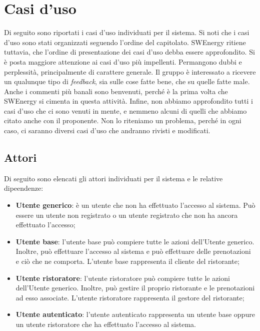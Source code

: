 \section{Casi d'uso}

Di seguito sono riportati i casi d'uso individuati per il sistema. Si noti che i
casi d'uso sono stati organizzati seguendo l'ordine del capitolato. SWEnergy
ritiene tuttavia, che l'ordine di presentazione dei casi d'uso debba essere
approfondito. Si è posta maggiore attenzione ai casi d'uso più impellenti.
Permangono dubbi e perplessità, principalmente di carattere generale. Il gruppo
è interessato a ricevere un qualunque tipo di \textit{feedback}, sia sulle cose
fatte bene, che su quelle fatte male. Anche i commenti più banali sono
benvenuti, perché è la prima volta che SWEnergy si cimenta in questa attività.
Infine, non abbiamo approfondito tutti i casi d'uso che ci sono venuti in mente,
e nemmeno alcuni di quelli che abbiamo citato anche con il proponente. Non lo
riteniamo un problema, perché in ogni caso, ci saranno diversi casi d'uso che
andranno rivisti e modificati.

\subsection{Attori}

Di seguito sono elencati gli attori individuati per il sistema e le relative
dipeendenze:
\begin{itemize}
	\item \textbf{Utente generico}: è un utente che non ha effettuato l'accesso al
	      sistema. Può essere un utente non registrato o un utente registrato che non ha
	      ancora effettuato l'accesso;

	\item \textbf{Utente base}: l'utente base può compiere tutte le azioni
	      dell'Utente generico. Inoltre, può effettuare l'accesso al sistema e può
	      effettuare delle prenotazioni e ciò che ne comporta. L'utente base rappresenta
	      il cliente del ristorante;

	\item \textbf{Utente ristoratore}: l'utente ristoratore può compiere tutte le
	      azioni dell'Utente generico. Inoltre, può gestire il proprio ristorante e le
	      prenotazioni ad esso associate. L'utente ristoratore rappresenta il gestore del
	      ristorante;

	\item \textbf{Utente autenticato}: l'utente autenticato rappresenta un utente
	      base oppure un utente ristoratore che ha effettuato l'accesso al sistema.
\end{itemize}
